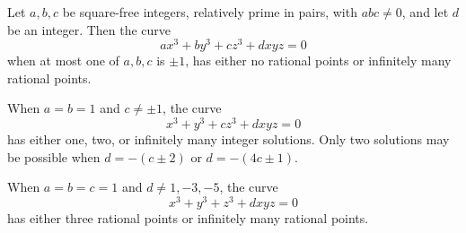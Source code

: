 \begin{proposition}
    Let $a,b,c$ be square-free integers, relatively prime in pairs, with $abc\ne0$, and let $d$ be an integer. Then the curve
\[
    ax^3+by^3+cz^3+dxyz=0
\]
    when at most one of $a,b,c$ is $\pm1$, has either no rational points or infinitely many rational points.
\end{proposition}

\begin{proposition}
    When $a=b=1$ and $c\ne\pm1$, the curve
\[
    x^3+y^3+cz^3+dxyz=0
\]
    has either one, two, or infinitely many integer solutions. Only two solutions may be possible when $d=-(c\pm2)$ or $d=-(4c\pm1)$.
\end{proposition}

\begin{proposition}
    When $a=b=c=1$ and $d\ne1,-3,-5$, the curve
\[
    x^3+y^3+z^3+dxyz=0
\]
    has either three rational points or infinitely many rational points.
\end{proposition}
